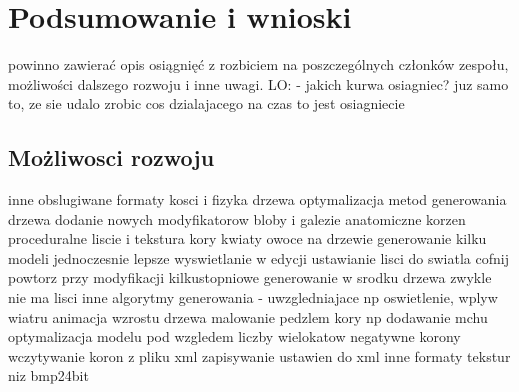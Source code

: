 

\chapter{Podsumowanie i wnioski}
powinno zawierać opis osiągnięć z rozbiciem na poszczególnych
członków zespołu, możliwości dalszego rozwoju i inne uwagi.
LO: - jakich kurwa osiagniec? juz samo to, ze sie udalo zrobic cos dzialajacego na czas to jest osiagniecie
\section{Możliwosci rozwoju}
inne obslugiwane formaty
kosci i fizyka drzewa
optymalizacja metod generowania drzewa
dodanie nowych modyfikatorow
bloby i galezie anatomiczne
korzen
proceduralne liscie i tekstura kory
kwiaty owoce na drzewie
generowanie kilku modeli jednoczesnie
lepsze wyswietlanie w edycji
ustawianie lisci do swiatla
cofnij powtorz przy modyfikacji
kilkustopniowe generowanie
w srodku drzewa zwykle nie ma lisci 
inne algorytmy generowania  - uwzgledniajace np oswietlenie, wplyw wiatru
animacja wzrostu drzewa
malowanie pedzlem kory np dodawanie mchu
optymalizacja modelu pod wzgledem liczby wielokatow
negatywne korony
wczytywanie koron z pliku xml
zapisywanie ustawien do xml
inne formaty tekstur niz bmp24bit

